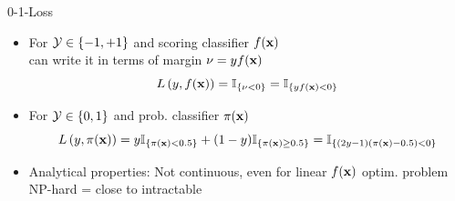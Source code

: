 \documentclass[11pt,compress,t,notes=noshow, xcolor=table]{beamer}
\begin{document}

\begin{frame}{0-1-Loss}

{
}

\vfill

\begin{itemize}
\item For $\mathcal{Y} \in \{-1, +1\}$ and scoring classifier $f(\mathbf{x})$\\
can write it in terms of margin $\nu = yf(\mathbf{x})$
$$
L\left(y, f(\mathbf{x})\right) = \mathbb{I}_{\{\nu < 0\}} = \mathbb{I}_{\{yf(\mathbf{x}) < 0\}}
$$
\item For $\mathcal{Y} \in \{0, 1\}$ and prob. classifier $\pi(\mathbf{x})$
$$
L\left(y, \pi(\mathbf{x})\right) = y \mathbb{I}_{\{\pi(\mathbf{x}) < 0.5\}} + (1-y) \mathbb{I}_{\{\pi(\mathbf{x}) \geq 0.5\}} = \mathbb{I}_{\{(2y-1)(\pi(\mathbf{x}) - 0.5) < 0 \}} 
$$
\item Analytical properties:  Not continuous, even for linear $f(\mathbf{x})$ optim. problem NP-hard = close to intractable 
\end{itemize}
\end{frame}
\end{document}
